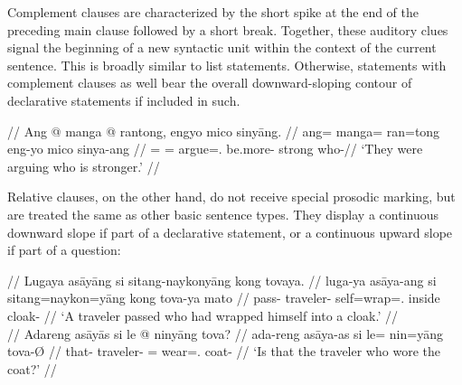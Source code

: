 Complement clauses are characterized by the short
spike at the end of the preceding main clause followed by a short break.
Together, these auditory clues signal the beginning of a new syntactic unit
within the context of the current sentence. This is broadly similar to list
statements. Otherwise, statements with complement clauses as well bear the
overall downward-sloping contour of declarative statements if included in such.

\ex\begingl
	\glpreamble{} //
	\gla Ang @ manga @ rantong, engyo mico sinyāng. //
	\glb ang= manga= ran=tong eng-yo mico sinya-ang //
	\glc \AgtT{}= \Prog{}= argue=\TplN{}.\Aarg{} be.more-\TsgN{} strong
		who-\Aarg{}//
	\glft `They were arguing who is stronger.' //
\endgl\xe

Relative clauses, on the other hand, do not receive 
special prosodic marking, but are treated the same as other basic sentence 
types. They display a continuous downward slope if part of a 
declarative statement, or a continuous upward slope if part of a question:

\pex[belowexskip=0em]
\a\begingl
	\glpreamble{} //
	\gla Lugaya asāyāng si sitang-naykonyāng kong tovaya. //
	\glb luga-ya asāya-ang si sitang=naykon=yāng kong tova-ya mato //
	\glc pass-\TsgM{} traveler-\Aarg{} \Rel{} self=wrap=\TsgM{}.\Aarg{} 
		inside cloak-\Loc{} //
	\glft `A traveler passed who had wrapped himself into a cloak.' //
\endgl
\\

\a\label{ex:travelercoat}\begingl
	\glpreamble{} //
	\gla Adareng asāyās si le @ ninyāng tova? //
	\glb ada-reng asāya-as si le= nin=yāng tova-Ø //
	\glc that-\AargI{} traveler-\Parg{} \Rel{} \PatTI{}= wear=\TsgM{}.\Aarg{} 
		coat-\Top{} //
	\glft `Is that the traveler who wore the coat?' //
\endgl
\xe

